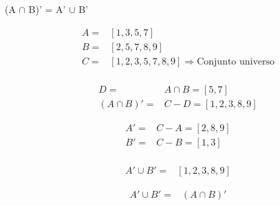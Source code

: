 \begin{question}
	(A $\cap$ B)' = A' $\cup$ B'
	
	
	\begin{equation}
	  \begin{split}
	  		A = & [1,3,5,7] \\
			B = & [2,5,7,8,9] \\
			C = & [1,2,3,5,7,8,9] \Rightarrow \text{Conjunto universo}\\
		\end{split}
	\end{equation}
	
	\begin{equation}
		\begin{aligned}
			D = & A \cap B = [5,7] \\
			(A \cap B)' = & C - D = [1,2,3,8,9] 
		\end{aligned}
	\end{equation}

	\begin{equation}
		\begin{aligned}
			A' = & C - A = [2,8,9] \\
			B' = & C - B = [1,3] \\
		\end{aligned}
	\end{equation}
	
	\begin{equation}
		\begin{aligned}
			A' \cup B' = &  [1,2,3,8,9]
		\end{aligned}
	\end{equation}
	
	\begin{equation}
		\begin{aligned}
			A' \cup B' = &  (A \cap B)'
		\end{aligned}
	\end{equation}
	
\end{question}

\newpage